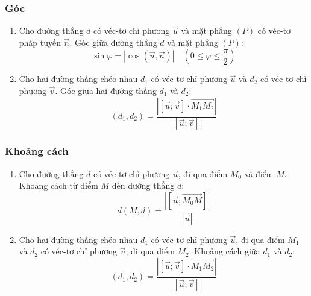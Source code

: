 \begin{tomtat}
	\subsubsection{Góc}
	\begin{enumerate}
	\item Cho đường thẳng $d$ có véc-tơ chỉ phương $\vec{u}$ và mặt phẳng $ (P) $ có véc-tơ pháp tuyến $ \vec{n} $. Góc giữa đường thẳng $d$ và mặt phẳng $ (P) $: $$\sin\varphi=|\cos\left(\vec{u},\vec{n}\right)| \quad \left(0\leq \varphi \leq \dfrac{\pi}{2}\right)$$
	\item Cho hai đường thẳng chéo nhau $d_1$ có véc-tơ chỉ phương $\vec{u}$ và $d_2$ có véc-tơ chỉ phương $\vec{v}$. Góc giữa hai đường thẳng $ d_1 $ và $ d_2 $:
	$$\left(d_1,d_2\right)=\dfrac{\left|\left[\vec{u};\vec{v}\right]\cdot\vec{M_1M_2}\right|}{|\left[\vec{u};\vec{v}\right]|} $$
	\end{enumerate}
	\subsubsection{Khoảng cách}
	\begin{enumerate}
	\item Cho đường thẳng $d$ có véc-tơ chỉ phương $\vec{u}$, đi qua điểm $M_0$ và điểm $ M $. Khoảng cách từ điểm $ M $ đến đường thẳng $ d $:
	$$ d\left(M,d\right)=\dfrac{|\left[\vec{u};\vec{M_0M}\right]|}{|\vec{u}|}$$
	\item Cho hai đường thẳng chéo nhau $d_1$ có véc-tơ chỉ phương $\vec{u}$, đi qua điểm $M_1 $ và $d_2$ có véc-tơ chỉ phương $\vec{v}$, đi qua điểm $M_2$. Khoảng cách giữa $ d_1 $ và $ d_2 $:
	$$\left(d_1,d_2\right)=\dfrac{\left|\left[\vec{u};\vec{v}\right]\cdot\vec{M_1M_2}\right|}{|\left[\vec{u};\vec{v}\right]|}$$
	\end{enumerate}
	\end{tomtat}
